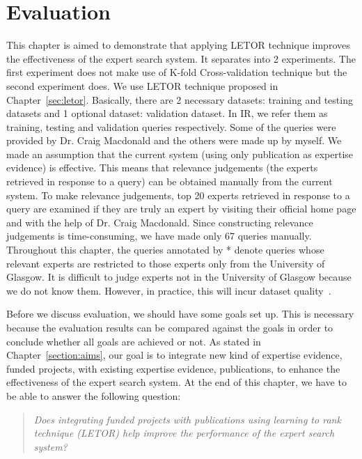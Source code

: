 
\chapter{Evaluation}\label{sec:evaluation}

This chapter is aimed to demonstrate that applying LETOR technique improves the effectiveness of the expert search system. 
It separates into 2 experiments. The first experiment does not make use of K-fold Cross-validation technique but the second experiment does.
We use LETOR technique proposed in Chapter~\ref{sec:letor}. Basically, there are 2 necessary datasets: training and testing datasets and 1 optional dataset:
validation dataset. In IR, we refer them as training, testing and validation queries respectively. 
Some of the queries were provided by Dr. Craig Macdonald and the others were made up by myself. 
We made an assumption that the current system (using only publication as expertise evidence) is effective. This means that relevance judgements 
(the experts retrieved in response to a query) can be obtained manually from the current system. To make relevance judgements, top 20 experts retrieved in response to a query
are examined if they are truly an expert by visiting their official home page and with the help of Dr. Craig Macdonald.
Since constructing relevance judgements is time-consuming, we have made only 67 queries manually. 
Throughout this chapter, the queries annotated by * denote queries whose relevant experts are restricted to those experts only from 
the University of Glasgow. It is difficult to judge experts not in the University of Glasgow because we 
do not know them. However, in practice, this will incur dataset quality~\cite{craig}.

Before we discuss evaluation, we should have some goals set up. This is necessary because the evaluation results can be compared against the goals in order to
conclude whether all goals are achieved or not. As stated in Chapter~\ref{section:aims}, our goal is to integrate new kind of expertise evidence, funded projects,
with existing expertise evidence, publications, to enhance the effectiveness of the expert search system. At the end of this chapter, we have to be able to 
answer the following question:

\begin{quotation}
 \textit{Does integrating funded projects with publications using learning to rank technique (LETOR) help improve the performance 
 of the expert search system?}
\end{quotation}


